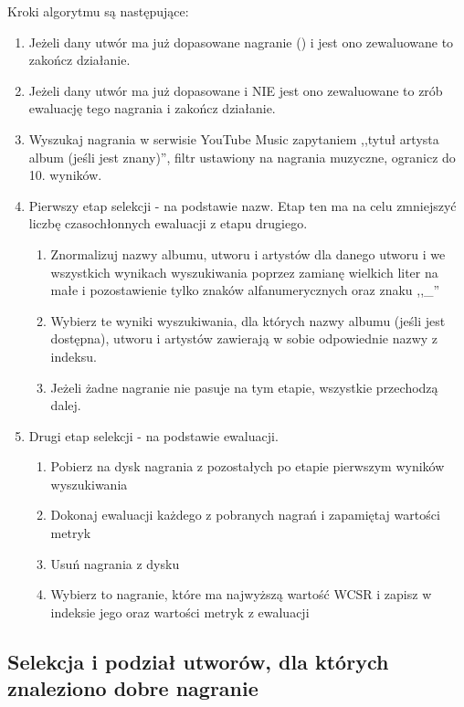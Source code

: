 Kroki algorytmu są następujące:
\begin{enumerate}
    \item Jeżeli dany utwór ma już dopasowane nagranie () i jest ono zewaluowane to
        zakończ działanie.
    \item Jeżeli dany utwór ma już dopasowane  i NIE jest ono zewaluowane to zrób
        ewaluację tego nagrania i zakończ działanie.
    \item Wyszukaj nagrania w serwisie YouTube Music zapytaniem ,,tytuł artysta album (jeśli jest
        znany)'', filtr ustawiony na nagrania muzyczne, ogranicz do 10. wyników.
    \item Pierwszy etap selekcji - na podstawie nazw. Etap ten ma na celu zmniejszyć liczbę
        czasochłonnych ewaluacji z etapu drugiego. 
        \begin{enumerate}
            \item Znormalizuj nazwy albumu, utworu i artystów dla danego utworu i we wszystkich
                wynikach wyszukiwania poprzez zamianę wielkich liter na małe i pozostawienie tylko
                znaków alfanumerycznych oraz znaku ,,\_''
            \item Wybierz te wyniki wyszukiwania, dla których nazwy albumu (jeśli jest
                dostępna), utworu i artystów zawierają w sobie odpowiednie nazwy z indeksu.
            \item Jeżeli żadne nagranie nie pasuje na tym etapie, wszystkie przechodzą dalej.
        \end{enumerate}
    \item Drugi etap selekcji - na podstawie ewaluacji.
        \begin{enumerate}
            \item Pobierz na dysk nagrania z pozostałych po etapie pierwszym wyników wyszukiwania
            \item Dokonaj ewaluacji każdego z pobranych nagrań i zapamiętaj wartości metryk
            \item Usuń nagrania z dysku
            \item Wybierz to nagranie, które ma najwyższą wartość WCSR i zapisz w indeksie jego
                 oraz wartości metryk z ewaluacji
        \end{enumerate}
\end{enumerate}

\subsection{Selekcja i podział utworów, dla których znaleziono dobre nagranie}

